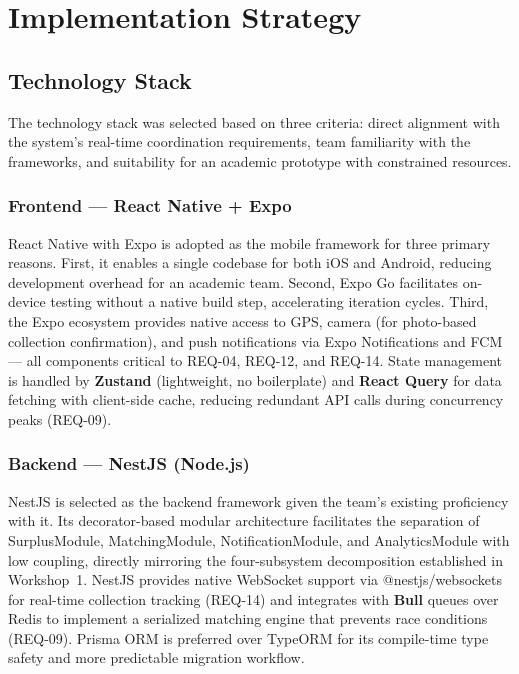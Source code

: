\documentclass[conference]{IEEEtran}
\begin{document}
\section{Implementation Strategy}

\subsection{Technology Stack}

The technology stack was selected based on three criteria: direct alignment with the system's real-time coordination requirements, team familiarity with the frameworks, and suitability for an academic prototype with constrained resources.

\subsubsection{Frontend — React Native + Expo}

React Native with Expo is adopted as the mobile framework for three primary reasons. First, it enables a single codebase for both iOS and Android, reducing development overhead for an academic team. Second, Expo Go facilitates on-device testing without a native build step, accelerating iteration cycles. Third, the Expo ecosystem provides native access to GPS, camera (for photo-based collection confirmation), and push notifications via Expo Notifications and FCM — all components critical to REQ-04, REQ-12, and REQ-14. State management is handled by \textbf{Zustand} (lightweight, no boilerplate) and \textbf{React Query} for data fetching with client-side cache, reducing redundant API calls during concurrency peaks (REQ-09).

\subsubsection{Backend — NestJS (Node.js)}

NestJS is selected as the backend framework given the team's existing proficiency with it. Its decorator-based modular architecture facilitates the separation of SurplusModule, MatchingModule, NotificationModule, and AnalyticsModule with low coupling, directly mirroring the four-subsystem decomposition established in Workshop~1. NestJS provides native WebSocket support via @nestjs/websockets for real-time collection tracking (REQ-14) and integrates with \textbf{Bull} queues over Redis to implement a serialized matching engine that prevents race conditions (REQ-09). Prisma ORM is preferred over TypeORM for its compile-time type safety and more predictable migration workflow.
\end{document}

